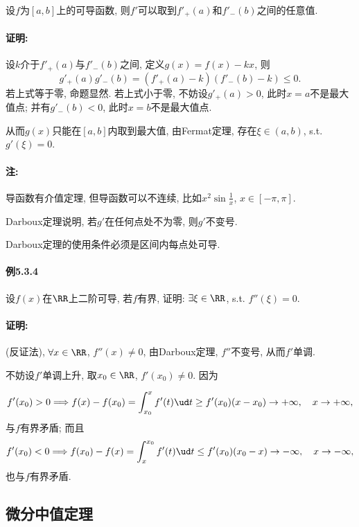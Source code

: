 设$f$为$[a,b]$上的可导函数, 则$f'$可以取到$f'_{+}(a)$和$f'_{-}(b)$之间的任意值.

\paragraph{证明:}

设$k$介于$f'_{+}(a)$与$f'_{-}(b)$之间, 定义$g(x)=f(x)-kx$, 则
\[
g'_{+}(a)g'_{-}(b)=(f'_{+}(a)-k)(f'_{-}(b)-k)\le0.
\]
若上式等于零, 命题显然. 若上式小于零, 不妨设$g'_{+}(a)>0$, 此时$x=a$不是最大值点; 并有$g'_{-}(b)<0$,
此时$x=b$不是最大值点.

从而$g(x)$只能在$[a,b]$内取到最大值, 由Fermat定理, 存在$\xi\in(a,b)$, s.t. $g'(\xi)=0$.

\paragraph{注:}

导函数有介值定理, 但导函数可以不连续, 比如$x^{2}\sin\frac{1}{x}$, $x\in[-\pi,\pi]$.

Darboux定理说明, 若$g'$在任何点处不为零, 则$g'$不变号.

Darboux定理的使用条件必须是区间内每点处可导.

\paragraph{例5.3.4}

设$f(x)$在$\RR$上二阶可导, 若$f$有界, 证明: $\exists\xi\in\RR$, s.t. $f''(\xi)=0$.

\paragraph{证明:}

(反证法), $\forall x\in\RR$, $f''(x)\ne0$, 由Darboux定理, $f''$不变号, 从而$f'$单调.

不妨设$f'$单调上升, 取$x_{0}\in\RR$, $f'(x_{0})\ne0$. 因为

\[
f'(x_{0})>0\Longrightarrow f(x)-f(x_{0})=\int_{x_{0}}^{x}f'(t)\ud t\ge f'(x_{0})(x-x_{0})\to+\infty,\quad x\to+\infty,
\]
与$f$有界矛盾; 而且
\[
f'(x_{0})<0\Longrightarrow f(x_{0})-f(x)=\int_{x}^{x_{0}}f'(t)\ud t\le f'(x_{0})(x_{0}-x)\to-\infty,\quad x\to-\infty,
\]
也与$f$有界矛盾.

\subsection{微分中值定理}

